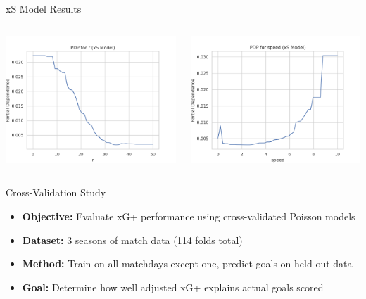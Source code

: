 \documentclass{beamer}
\begin{document}
\begin{frame}{xS Model Results}
\begin{columns}[c]
  \includegraphics[width=\linewidth]{figures/xS_PDP_r.png}

  \includegraphics[width=\linewidth]{figures/xS_PDP_speed.png}
\end{columns}
\end{frame}

\begin{frame}{Cross-Validation Study}
\begin{itemize}
\item \textbf{Objective:} Evaluate xG+ performance using cross-validated Poisson models
\item \textbf{Dataset:} 3 seasons of match data (114 folds total)
\item \textbf{Method:} Train on all matchdays except one, predict goals on held-out data
\item \textbf{Goal:} Determine how well adjusted xG+ explains actual goals scored
\end{itemize}
\end{frame}
\end{document}

